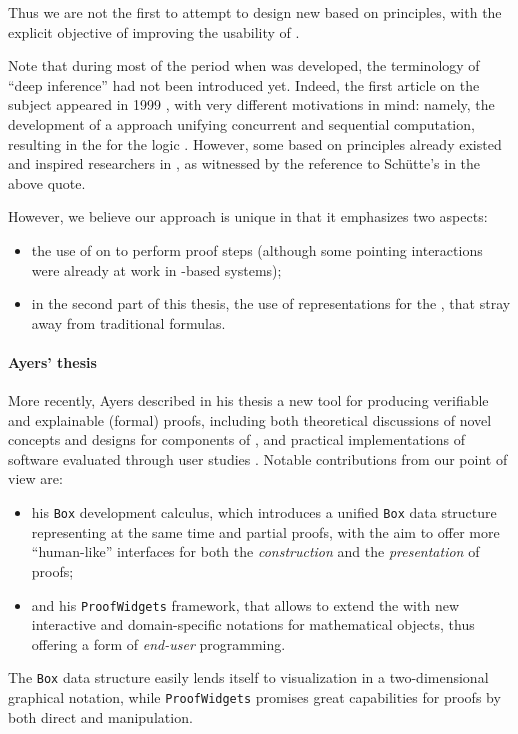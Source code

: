 Thus we are not the first to attempt to design new  based on  principles, with the explicit objective of improving the usability of
.
\begin{digression}
  \AP
  Note that during most of the period when  was developed,
the terminology of ``deep inference'' had not been introduced yet. Indeed, the
first article on the subject appeared in 1999 \cite{Guglielmi1999ACO}, with very
different motivations in mind: namely, the development of a
 approach unifying concurrent and sequential computation,
resulting in the  for the logic . However,
some  based on  principles already existed
and inspired researchers in , as witnessed by the reference
to Schütte's  in the above quote.
\end{digression}
However, we believe our approach is unique in that it emphasizes two aspects:
\begin{itemize}
  \item the use of \emph{} on  to perform
  proof steps (although some pointing interactions were already at work in
  -based systems);
  \item in the second part of this thesis, the use of \emph{}
  representations for the , that stray away from traditional
   formulas.
\end{itemize}

\paragraph{Ayers' thesis}

More recently, Ayers described in his thesis a new tool for producing verifiable
and explainable (formal) proofs, including both theoretical discussions of novel
concepts and designs for components of , and practical
implementations of software evaluated through user studies
. Notable contributions from our point of view are:
\begin{itemize}
  \item his \texttt{Box} development calculus, which introduces a unified
\texttt{Box} data structure representing at the same time  and partial
proofs, with the aim to offer more ``human-like'' interfaces for both the
\emph{construction} and the \emph{presentation} of proofs;
  \item and his \texttt{ProofWidgets} framework, that allows to extend the
  with new interactive and domain-specific
notations for mathematical objects, thus offering a form of \emph{end-user}
programming.
\end{itemize}
The \texttt{Box} data structure easily lends itself to visualization in a
two-dimensional graphical notation, while \texttt{ProofWidgets} promises great
capabilities for proofs by both direct and  manipulation.


